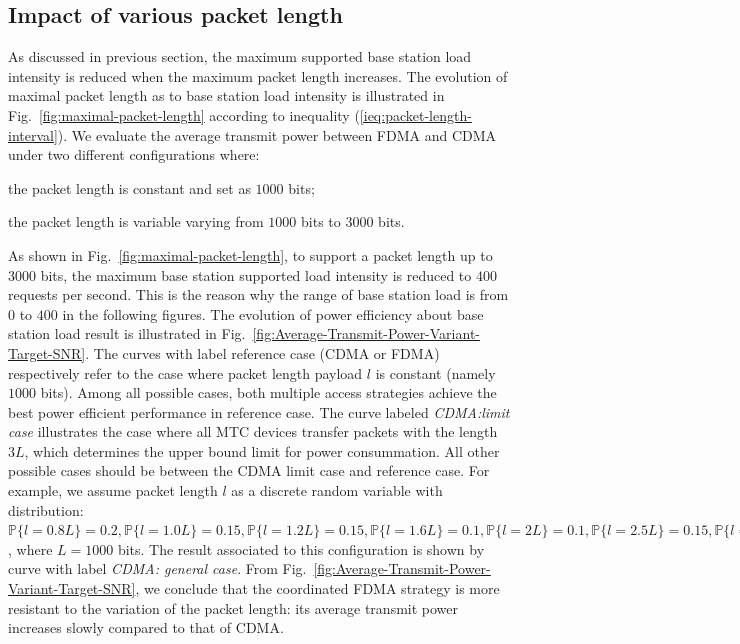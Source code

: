 \subsection{Impact of various packet length}
As discussed in previous section, the maximum supported base station load intensity is reduced when the maximum packet length increases.
The evolution of maximal packet length as to base station load intensity is illustrated in Fig.~\ref{fig:maximal-packet-length} according to inequality (\ref{ieq:packet-length-interval}). 
We evaluate the average transmit power between FDMA and CDMA under two different configurations where:\begin{inparaenum}[(i)]
	\item the packet length is constant and set as $1000$ bits;
	\item the packet length is variable varying from $1000$ bits to $3000$ bits.
\end{inparaenum}
As shown in Fig.~\ref{fig:maximal-packet-length}, to support a packet length up to $3000$ bits, the maximum base station supported load intensity is reduced to $400$ requests per second. This is the reason why the range of base station load is from $0$ to $400$ in the following figures. The evolution of power efficiency about base station load result is illustrated in Fig.~\ref{fig:Average-Transmit-Power-Variant-Target-SNR}. The curves with label reference case (CDMA or FDMA) respectively refer to the case where packet length payload $l$ is constant (namely $1000$ bits). Among all possible cases, both multiple access strategies achieve the best power efficient performance in reference case. The curve labeled \textit{\emph{CDMA:limit case}} illustrates the case where all MTC devices transfer packets with the length $3L$, which determines the upper bound limit for power consummation. All other possible cases should be between the CDMA limit case and reference case. For example, we assume packet length $l$ as a discrete random variable with distribution: $\mathbb{P}\{l=0.8L\} =0.2, \mathbb{P}\{l=1.0L\} =0.15, \mathbb{P}\{l=1.2L\} =0.15, \mathbb{P}\{l=1.6L\} =0.1, \mathbb{P}\{l=2L\} =0.1, \mathbb{P}\{l=2.5L\} =0.15, \mathbb{P}\{l=3L\} =0.15$, where $L=1000$ bits. The result associated to this configuration is shown by curve with label \textit{\emph{CDMA: general case}}.
From Fig.~\ref{fig:Average-Transmit-Power-Variant-Target-SNR}, we conclude that the coordinated FDMA strategy is more resistant to the variation of the packet length: its average transmit power increases slowly compared to that of CDMA. 

